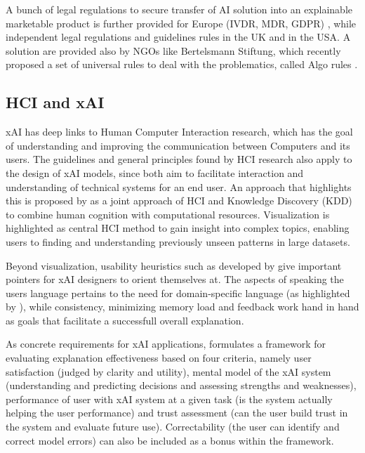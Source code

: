 A bunch of legal regulations to secure transfer of AI solution into an explainable marketable product is further provided for Europe (IVDR, MDR, GDPR) \cite{GDPR}, while independent legal regulations and guidelines rules in the UK and in the USA. A solution are provided also by NGOs like Bertelsmann Stiftung, which recently proposed a set of universal rules to deal with the problematics, called Algo rules \cite{Algo.rules}.



\subsection{HCI and xAI}

xAI has deep links to Human Computer Interaction research, which has the goal of understanding and improving the communication between Computers and its users. The guidelines and general principles found by HCI research also apply to the design of xAI models, since both aim to facilitate interaction and understanding of technical systems for an end user.
An approach that highlights this is proposed by \cite{holzinger2013human} as a joint approach of HCI and Knowledge Discovery (KDD) to combine human cognition with computational resources. Visualization is highlighted as central HCI method to gain insight into complex topics, enabling users to finding and understanding previously unseen patterns in large datasets. 

Beyond visualization, usability heuristics such as developed by \cite{nielsen2005ten} give important pointers for xAI designers to orient themselves at. The aspects of speaking the users language pertains to the need for domain-specific language (as highlighted by \cite{arrieta2020explainable}), while consistency, minimizing memory load and feedback work hand in hand as goals that facilitate a successfull overall explanation. 

As concrete requirements for xAI applications, \cite{gunning2019darpa} formulates a framework for evaluating explanation effectiveness based on four criteria, namely user satisfaction (judged by clarity and utility), mental model of the xAI system (understanding and predicting decisions and assessing strengths and weaknesses), performance of user with xAI system at a given task (is the system actually helping the user performance) and trust assessment (can the user build trust in the system and evaluate future use). Correctability (the user can identify and correct model errors) can also be included as a bonus within the framework.


